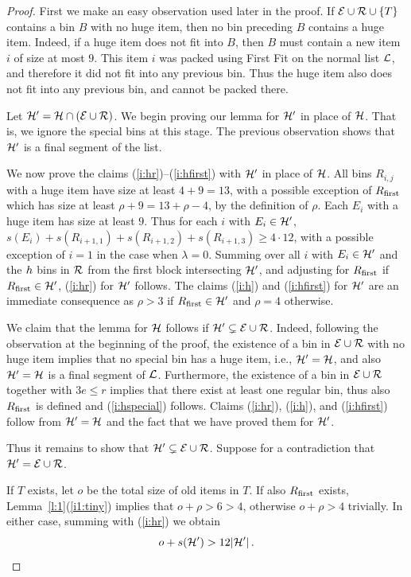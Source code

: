 \begin{proof}
First we make an easy observation used later in the proof. If
${\mathcal E}\cup{\mathcal R}\cup\{T\}$ contains a bin $B$ with no huge item,
then no bin preceding $B$ contains a huge item.  Indeed, if a huge
item does not fit into $B$, then $B$ must contain a new item $i$ of
size at most $9$. This item $i$ was packed using First Fit on the
normal list ${\mathcal L}$, and therefore it did not fit into any previous
bin. Thus the huge item also does not fit into any previous bin, and
cannot be packed there.

Let ${\mathcal H}'={\mathcal H}\cap({\mathcal E}\cup{\mathcal R})$. We begin proving our lemma for
${\mathcal H}'$ in place of ${\mathcal H}$.  That is, we ignore the special bins at
this stage. 
The previous observation shows that ${\mathcal H}'$ is a final segment of the
list.

We now prove the claims (\ref{i:hr})--(\ref{i:hfirst}) with
${\mathcal H}'$ in place of ${\mathcal H}$. 
All bins $R_{i,j}$ with a huge item have size at least $4+9=13$, with
a possible exception of $R_{\mbox{\rm\scriptsize first}}$ which has size at least
$\rho+9=13+\rho-4$, by the definition of $\rho$. Each $E_i$ with a
huge item has size at least $9$. Thus for each $i$ with
$E_i\in{\mathcal H}'$, $s(E_i)+s(R_{i+1,1})+s(R_{i+1,2})+s(R_{i+1,3})\geq
4\cdot 12$, with a possible exception of $i=1$ in the case when
$\lambda=0$. Summing over all $i$ with $E_i\in{\mathcal H}'$ and the ${h}$
bins in ${\mathcal R}$ from the first block intersecting ${\mathcal H}'$, and
adjusting for $R_{\mbox{\rm\scriptsize first}}$ if $R_{\mbox{\rm\scriptsize first}}\in{\mathcal H}'$, (\ref{i:hr}) for ${\mathcal H}'$
follows. The claims (\ref{i:h}) and (\ref{i:hfirst}) for ${\mathcal H}'$ are
an immediate consequence as $\rho>3$ if $R_{\mbox{\rm\scriptsize first}}\in{\mathcal H}'$ and $\rho=4$
otherwise.

We claim that the lemma for ${\mathcal H}$ follows if
${\mathcal H}'\subsetneq{\mathcal E}\cup{\mathcal R}$. Indeed, following the observation at
the beginning of the proof, the existence of a bin in ${\mathcal E}\cup{\mathcal R}$
with no huge item implies that no special bin has a huge item, i.e.,
${\mathcal H}'={\mathcal H}$, and also ${\mathcal H}'={\mathcal H}$ is a final segment of
${\mathcal L}$. Furthermore, the existence of a bin in ${\mathcal E}\cup{\mathcal R}$
together with $3e\leq r$ implies that there exist at least one regular
bin, thus also $R_{\mbox{\rm\scriptsize first}}$ is defined and (\ref{i:hspecial}) follows.
Claims (\ref{i:hr}), (\ref{i:h}), and (\ref{i:hfirst}) follow from
${\mathcal H}'={\mathcal H}$ and the fact that we have proved them for ${\mathcal H}'$.

Thus it remains to show that ${\mathcal H}'\subsetneq{\mathcal E}\cup{\mathcal R}$.
Suppose for a contradiction that ${\mathcal H}'={\mathcal E}\cup{\mathcal R}$.

If $T$ exists, let $o$ be the total size of old items in $T$. If also
$R_{\mbox{\rm\scriptsize first}}$ exists, Lemma~\ref{l:1}(\ref{i1:tiny}) implies that
$o+\rho>6>4$, otherwise $o+\rho>4$ trivially. In either case, summing
with (\ref{i:hr}) we obtain
\begin{equation}\label{eq:Told}
  o+s({\mathcal H}')>12|{\mathcal H}'|\,.
\end{equation}


\end{proof}
